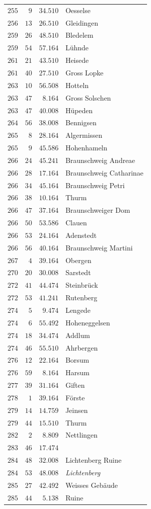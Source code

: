 \begin{longtable}{@{}rrrp{.61\linewidth}@{}}
\(255\)&\(9\)&\(34.510\)&\raggedright Oesselse\tabularnewline
\(256\)&\(13\)&\(26.510\)&\raggedright Gleidingen\tabularnewline
\(259\)&\(26\)&\(48.510\)&\raggedright Bledelem\tabularnewline
\(259\)&\(54\)&\(57.164\)&\raggedright Lühnde\tabularnewline
\(261\)&\(21\)&\(43.510\)&\raggedright Heisede\tabularnewline
\(261\)&\(40\)&\(27.510\)&\raggedright Gross Lopke\tabularnewline
\(263\)&\(10\)&\(56.508\)&\raggedright Hotteln\tabularnewline
\(263\)&\(47\)&\(8.164\)&\raggedright Gross Solschen\tabularnewline
\(263\)&\(47\)&\(40.008\)&\raggedright Hüpeden\tabularnewline
\(264\)&\(56\)&\(38.008\)&\raggedright Bennigsen\tabularnewline
\(265\)&\(8\)&\(28.164\)&\raggedright Algermissen\tabularnewline
\(265\)&\(9\)&\(45.586\)&\raggedright Hohenhameln\tabularnewline
\(266\)&\(24\)&\(45.241\)&\raggedright Braunschweig Andreae\tabularnewline
\(266\)&\(28\)&\(17.164\)&\raggedright Braunschweig Catharinae\tabularnewline
\(266\)&\(34\)&\(45.164\)&\raggedright Braunschweig Petri\tabularnewline
\(266\)&\(38\)&\(10.164\)&\raggedright Thurm\tabularnewline
\(266\)&\(47\)&\(37.164\)&\raggedright Braunschweiger Dom\tabularnewline
\(266\)&\(50\)&\(53.586\)&\raggedright Clauen\tabularnewline
\(266\)&\(53\)&\(24.164\)&\raggedright Adenstedt\tabularnewline
\(266\)&\(56\)&\(40.164\)&\raggedright Braunschweig Martini\tabularnewline
\(267\)&\(4\)&\(39.164\)&\raggedright Obergen\tabularnewline
\(270\)&\(20\)&\(30.008\)&\raggedright Sarstedt\tabularnewline
\(272\)&\(41\)&\(44.474\)&\raggedright Steinbrück\tabularnewline
\(272\)&\(53\)&\(41.241\)&\raggedright Rutenberg\tabularnewline
\(274\)&\(5\)&\(9.474\)&\raggedright Lengede\tabularnewline
\(274\)&\(6\)&\(55.492\)&\raggedright Hoheneggelsen\tabularnewline
\(274\)&\(18\)&\(34.474\)&\raggedright Addlum\tabularnewline
\(274\)&\(46\)&\(55.510\)&\raggedright Ahrbergen\tabularnewline
\(276\)&\(12\)&\(22.164\)&\raggedright Borsum\tabularnewline
\(276\)&\(59\)&\(8.164\)&\raggedright Harsum\tabularnewline
\(277\)&\(39\)&\(31.164\)&\raggedright Giften\tabularnewline
\(278\)&\(1\)&\(39.164\)&\raggedright Förste\tabularnewline
\(279\)&\(14\)&\(14.759\)&\raggedright Jeinsen\tabularnewline
\(279\)&\(44\)&\(15.510\)&\raggedright Thurm\tabularnewline
\(282\)&\(2\)&\(8.809\)&\raggedright Nettlingen\tabularnewline
\(283\)&\(46\)&\(17.474\)&\raggedright \tabularnewline
\(284\)&\(48\)&\(32.008\)&\raggedright Lichtenberg Ruine\tabularnewline
\(284\)&\(53\)&\(48.008\)&\raggedright \textit{Lichtenberg}\tabularnewline
\(285\)&\(27\)&\(42.492\)&\raggedright Weisses Gebäude\tabularnewline
\(285\)&\(44\)&\(5.138\)&\raggedright Ruine\tabularnewline
\end{longtable}
\endgroup
